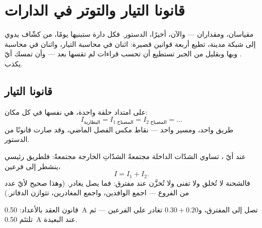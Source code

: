 \chapter{قانونا التيار والتوتر في الدارات}\label{ch:g8:circuit-laws}

مقياسان، ومقداران --- والآن، أخيرًا، الدستور. فكل دارة ستبنيها
يومًا، من كشّاف يدوي إلى شبكة مدينة، تطيع أربعة قوانين قصيرة:
اثنان في محاسبة التيار، واثنان في محاسبة . وبها وبقليل
من الجبر تستطيع أن تحسب قراءات لم تقسها بعد --- وأن تمسك أيّ
 يكذب.

\section{قانونا التيار}

\begin{proposition}\label{prop:g8:circuit-laws:seriesI}
على امتداد حلقة واحدة،  هي نفسها في كل مكان:
\[
I_{\text{البطارية}} = I_{\text{المصباح 1}} = I_{\text{المصباح 2}} =
\dots
\]
طريق واحد، ومسير واحد --- نقاط مكس الفصل الماضي، وقد صارت
قانونًا من الدستور.
\end{proposition}

\begin{proposition}\label{prop:g8:circuit-laws:junction}
عند أيّ ، تساوي الشدّات الداخلة مجتمعةً الشدّاتِ الخارجة
مجتمعةً: فلطريق رئيسي ينشطر إلى فرعين،
\[
I = I_1 + I_2 .
\]
فالشحنة لا تُخلق ولا تفنى ولا تُخزَّن عند مفترق: فما يصل
يغادر. (وهذا صحيح لأيّ عدد من الفروع --- اجمع الوافدين، واجمع
المغادرين، تتوازن الدفاتر.)
\end{proposition}

\begin{omfigure}

{\small قانون العقد بالأعداد: \qty{0.50}{A} تصل إلى المفترق،
و$0.30 + 0.20$ تغادر على الفرعين --- ثم تلتئم \qty{0.50}{A}
عند  البعيدة.}
\end{omfigure}

